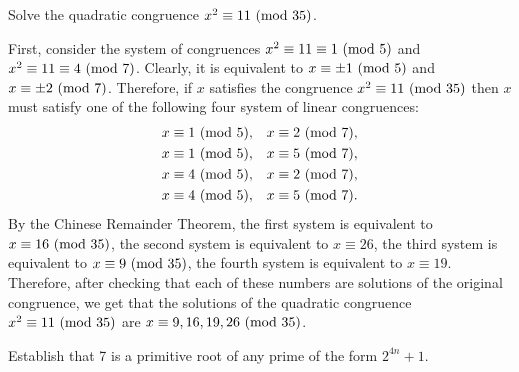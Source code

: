 \begin{exercise}
    Solve the quadratic congruence $x^2 \equiv 11 \ (\mathrm{mod}\ 35)$.  \\
\end{exercise}

\begin{solution}
    First, consider the system of congruences $x^2 \equiv 11 \equiv 1 \ (\mathrm{mod}\ 5)$ and $x^2 \equiv 11 \equiv 4 \ (\mathrm{mod}\ 7)$. Clearly, it is equivalent to $x \equiv \pm 1 \ (\mathrm{mod}\ 5)$ and $x \equiv \pm 2 \ (\mathrm{mod}\ 7)$. Therefore, if $x$ satisfies the congruence $x^2 \equiv 11 \ (\mathrm{mod}\ 35)$ then $x$ must satisfy one of the following four system of linear congruences:
    \begin{align*}
        x &\equiv 1 \ (\mathrm{mod}\ 5), & x &\equiv 2 \ (\mathrm{mod}\ 7), \\
        x &\equiv 1 \ (\mathrm{mod}\ 5), & x &\equiv 5 \ (\mathrm{mod}\ 7), \\
        x &\equiv 4 \ (\mathrm{mod}\ 5), & x &\equiv 2 \ (\mathrm{mod}\ 7), \\
        x &\equiv 4 \ (\mathrm{mod}\ 5), & x &\equiv 5 \ (\mathrm{mod}\ 7).
    \end{align*}
    By the Chinese Remainder Theorem, the first system is equivalent to $x \equiv 16 \ (\mathrm{mod}\ 35)$, the second system is equivalent to $x \equiv 26$, the third system is equivalent to $x \equiv 9 \ (\mathrm{mod}\ 35)$, the fourth system is equivalent to $x \equiv 19$. Therefore, after checking that each of these numbers are solutions of the original congruence, we get that the solutions of the quadratic congruence $x^2 \equiv 11 \ (\mathrm{mod}\ 35)$ are $x \equiv 9,16,19,26 \ (\mathrm{mod}\ 35)$. \\
\end{solution}

\begin{exercise}
    Establish that 7 is a primitive root of any prime of the form $2^{4n} + 1$.  \\
\end{exercise}

